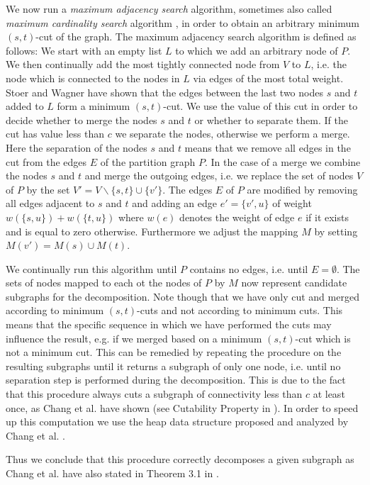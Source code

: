 \documentclass[a4paper,UKenglish,cleveref, autoref, thm-restate,authorcolumns]{../lipics/lipics-v2019}
\begin{document}
We now run a \textit{maximum adjacency search} algorithm, sometimes also called \textit{maximum cardinality search} algorithm \cite{Stoer1997}, in order to obtain an arbitrary minimum $(s,t)$-cut of the graph.
The maximum adjacency search algorithm is defined as follows: We start with an empty list $L$ to which we add an arbitrary node of $P$. We then continually add the most tightly connected node from $V$ to $L$, i.e. the node which is connected to the nodes in $L$ via edges of the most total weight. Stoer and Wagner \cite{Stoer1997} have shown that the edges between the last two nodes $s$ and $t$ added to $L$ form a minimum $(s,t)$-cut.
We use the value of this cut in order to decide whether to merge the nodes $s$ and $t$ or whether to separate them. If the cut has value less than $c$ we separate the nodes, otherwise we perform a merge.
Here the separation of the nodes $s$ and $t$ means that we remove all edges in the cut from the edges $E$ of the partition graph $P$.
In the case of a merge we combine the nodes $s$ and $t$ and merge the outgoing edges, i.e. we replace the set of nodes $V$ of $P$ by the set $V'=V\backslash\{s,t\}\cup\{v'\}$. The edges $E$ of $P$ are modified by removing all edges adjacent to $s$ and $t$ and adding an edge $e'=\{v',u\}$ of weight $w(\{s,u\})+w(\{t,u\})$ where $w(e)$ denotes the weight of edge $e$ if it exists and is equal to zero otherwise.
Furthermore we adjust the mapping $M$ by setting $M(v')=M(s)\cup M(t)$.

We continually run this algorithm until $P$ contains no edges, i.e. until $E=\emptyset$. The sets of nodes mapped to each ot the nodes of $P$ by $M$ now represent candidate subgraphs for the decomposition. Note though that we have only cut and merged according to minimum $(s,t)$-cuts and not according to minimum cuts. This means that the specific sequence in which we have performed the cuts may influence the result, e.g. if we merged based on a minimum $(s,t)$-cut which is not a minimum cut.
This can be remedied by repeating the procedure on the resulting subgraphs until it returns a subgraph of only one node, i.e. until no separation step is performed during the decomposition. This is due to the fact that this procedure always cuts a subgraph of connectivity less than $c$ at least once, as Chang et al. have shown (see Cutability Property in \cite{Chang2013}).
In order to speed up this computation we use the heap data structure proposed and analyzed by Chang et al. \cite{Chang2013}.

Thus we conclude that this procedure correctly decomposes a given subgraph as Chang et al. have also stated in Theorem 3.1 in \cite{Chang2013}.
\end{document}
